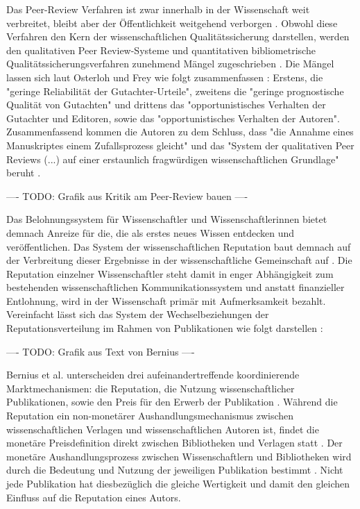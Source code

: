 Das Peer-Review Verfahren ist zwar innerhalb in der Wissenschaft weit verbreitet, bleibt aber der Öffentlichkeit weitgehend verborgen \cite{Konneker_2013}. Obwohl diese Verfahren den Kern der wissenschaftlichen Qualitätssicherung darstellen, werden den qualitativen Peer Review-Systeme und quantitativen bibliometrische Qualitätssicherungsverfahren zunehmend Mängel zugeschrieben \cite{Peters_2014} \cite{Lee_2012} \cite{bar_2009_wissenschaftliche} \cite{osterloh2008anreize} \cite{ware_2008_peer} \cite{Jansen_2007} \cite{smith_1999_opening}. Die Mängel lassen sich laut Osterloh und Frey wie folgt zusammenfassen \cite{osterloh2008anreize}: Erstens, die "geringe Reliabilität der Gutachter-Urteile", zweitens die "geringe prognostische Qualität von Gutachten" und drittens das "opportunistisches Verhalten der Gutachter und Editoren, sowie das "opportunistisches Verhalten der Autoren". Zusammenfassend kommen die Autoren zu dem Schluss, dass "die Annahme eines Manuskriptes einem Zufallsprozess gleicht" und das "System der qualitativen Peer Reviews (...) auf einer erstaunlich fragwürdigen wissenschaftlichen Grundlage" beruht \cite{osterloh2008anreize}.

---- TODO: Grafik aus Kritik am Peer-Review bauen \cite{mueller_2009_peerreview} ----

Das Belohnungssystem für Wissenschaftler und Wissenschaftlerinnen bietet demnach Anreize für die, die als erstes neues Wissen entdecken und veröffentlichen. Das System der wissenschaftlichen Reputation baut demnach auf der Verbreitung dieser Ergebnisse in der wissenschaftliche Gemeinschaft auf \cite{Fabrizio_2008}. Die Reputation einzelner Wissenschaftler steht damit in enger Abhängigkeit zum bestehenden wissenschaftlichen Kommunikationssystem und anstatt finanzieller Entlohnung, wird in der Wissenschaft primär mit Aufmerksamkeit bezahlt. Vereinfacht lässt sich das System der Wechselbeziehungen der Reputationsverteilung im Rahmen von Publikationen wie folgt darstellen \cite{cite:21a}:

---- TODO: Grafik aus Text von Bernius ----

Bernius et al. unterscheiden drei aufeinandertreffende koordinierende Marktmechanismen: die Reputation, die Nutzung wissenschaftlicher Publikationen, sowie den Preis für den Erwerb der Publikation \cite{cite:21a}. Während die Reputation ein non-monetärer Aushandlungsmechanismus zwischen wissenschaftlichen Verlagen und wissenschaftlichen Autoren ist, findet die monetäre Preisdefinition direkt zwischen Bibliotheken und Verlagen statt \cite{EuropeanCommission_sciencepub_2006}. Der monetäre Aushandlungsprozess zwischen Wissenschaftlern und Bibliotheken wird durch die Bedeutung und Nutzung der jeweiligen Publikation bestimmt \cite{cite:21a}. Nicht jede Publikation hat diesbezüglich die gleiche Wertigkeit \cite{suchen} und damit den gleichen Einfluss auf die Reputation eines Autors.

